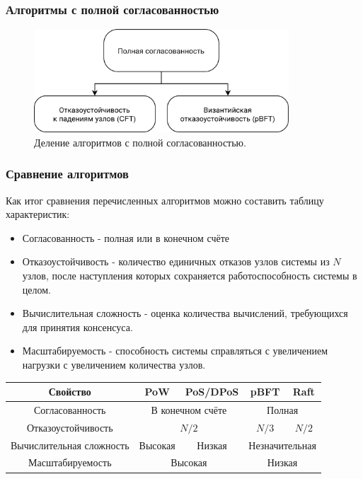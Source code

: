 \documentclass[pdf, 10pt, unicode,aspectratio=169]{beamer} %
\begin{document}
\begin{frame}
\frametitle{Алгоритмы с полной согласованностью}

\begin{figure}[H]
\centering
\includegraphics[width=0.85\textwidth]{src/pics/consensus_types_3.png}
\caption{Деление алгоритмов с полной согласованностью.}
\label{fig:consensus_types_3}
\end{figure}

\end{frame}


\begin{frame}
\frametitle{Сравнение алгоритмов}
Как итог сравнения перечисленных алгоритмов можно составить таблицу характеристик:
\begin{itemize}
\item Согласованность - полная или в конечном счёте
\item Отказоустойчивость - количество единичных отказов узлов системы из $N$ узлов, после наступления которых сохраняется работоспособность системы в целом. 
\item Вычислительная сложность - оценка количества вычислений, требующихся для принятия консенсуса.
\item Масштабируемость - способность системы справляться с увеличением нагрузки с увеличением количества узлов.
\end{itemize}

\begin{table}[H]
\begin{center}
\begin{tabular}{|c|c|c|c|c|}
\hline
Свойство & PoW & PoS/DPoS & pBFT & Raft \\
\hline
Согласованность & \multicolumn{2}{c}{В конечном счёте} & \multicolumn{2}{|c|}{Полная}    \\
\hline
Отказоустойчивость & \multicolumn{2}{c|}{$N/2$} & $N/3$ & $N/2$  \\
\hline
Вычислительная сложность  & Высокая & Низкая & \multicolumn{2}{c|}{Незначительная}  \\
\hline
Масштабируемость & \multicolumn{2}{c|}{Высокая} & \multicolumn{2}{c|}{Низкая}  \\
\hline
\end{tabular}
\end{center}
\end{table} 

\end{frame}
\end{document}
